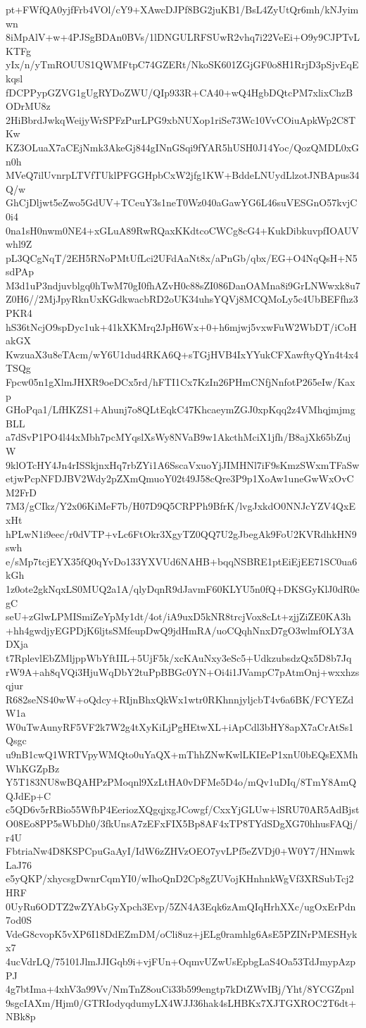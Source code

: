 pt+FWfQA0yjfFrb4VOl/cY9+XAwcDJPf8BG2juKB1/BsL4ZyUtQr6mh/kNJyimwn
8iMpAlV+w+4PJSgBDAn0BVs/1lDNGULRFSUwR2vhq7i22VeEi+O9y9CJPTvLKTFg
yIx/n/yTmROUUS1QWMFtpC74GZERt/NkoSK601ZGjGF0o8H1RrjD3pSjvEqEkqsl
fDCPPypGZVG1gUgRYDoZWU/QIp933R+CA40+wQ4HgbDQtcPM7xlixChzBODrMU8z
2HiBbrdJwkqWeijyWrSPFzPurLPG9xbNUXop1riSe73Wc10VvCOiuApkWp2C8TKw
KZ3OLuaX7aCEjNmk3AkeGj844gINnGSqi9fYAR5hUSH0J14Yoc/QozQMDL0xGn0h
MVeQ7ilUvnrpLTVfTUklPFGGHpbCxW2jfg1KW+BddeLNUydLlzotJNBApus34Q/w
GhCjDljwt5eZwo5GdUV+TCeuY3s1neT0Wz040aGawYG6L46suVESGnO57kvjC0i4
0na1sH0nwm0NE4+xGLuA89RwRQaxKKdtcoCWCg8cG4+KukDibkuvpfIOAUVwhl9Z
pL3QCgNqT/2EH5RNoPMtUfLci2UFdAaNt8x/aPnGb/qbx/EG+O4NqQsH+N5sdPAp
M3d1uP3ndjuvblgq0hTwM70gI0fhAZvH0c88sZI086DanOAMna8i9GrLNWwxk8u7
Z0H6//2MjJpyRknUxKGdkwacbRD2oUK34uhsYQVj8MCQMoLy5c4UbBEFfhz3PKR4
hS36tNcjO9spDyc1uk+41kXKMrq2JpH6Wx+0+h6mjwj5vxwFuW2WbDT/iCoHakGX
KwzuaX3u8eTAcm/wY6U1dud4RKA6Q+sTGjHVB4IxYYukCFXawftyQYn4t4x4TSQg
Fpcw05n1gXlmJHXR9oeDCx5rd/hFTI1Cx7KzIn26PHmCNfjNnfotP265eIw/Kaxp
GHoPqa1/LfHKZS1+Ahunj7o8QLtEqkC47KhcaeymZGJ0xpKqq2z4VMhqjmjmgBLL
a7dSvP1PO4l44xMbh7pcMYqslXsWy8NVaB9w1AkcthMciX1jfh/B8ajXk65bZujW
9klOTcHY4Jn4rISSkjnxHq7rbZYi1A6SscaVxuoYjJIMHNl7iF9sKmzSWxmTFaSw
etjwPcpNFDJBV2Wdy2pZXmQmuoY02t49J58cQre3P9p1XoAw1uneGwWxOvCM2FrD
7M3/gCIkz/Y2x06KiMeF7b/H07D9Q5CRPPh9BfrK/lvgJxkdO0NNJcYZV4QxExHt
hPLwN1i9eec/r0dVTP+vLc6FtOkr3XgyTZ0QQ7U2gJbegAk9FoU2KVRdhkHN9swh
e/sMp7tcjEYX35fQ0qYvDo133YXVUd6NAHB+bqqNSBRE1ptEiEjEE71SC0ua6kGh
1z0ote2gkNqxLS0MUQ2a1A/qlyDqnR9dJavmF60KLYU5n0fQ+DKSGyKlJ0dR0egC
seU+zGlwLPMISmiZeYpMy1dt/4ot/iA9uxD5kNR8trcjVox8cLt+zjjZiZE0KA3h
+hh4gwdjyEGPDjK6ljtsSMfeupDwQ9jdHmRA/uoCQqhNnxD7gO3wlmfOLY3ADXja
t7RplevlEbZMljppWbYftIIL+5UjF5k/xcKAuNxy3eSc5+UdkzubsdzQx5D8b7Jq
rW9A+ah8qVQi3HjuWqDbY2tuPpBBGc0YN+Oi4i1JVampC7pAtmOnj+wxxhzsqjur
R682seNS40wW+oQdcy+RIjnBhxQkWx1wtr0RKhnnjyljcbT4v6a6BK/FCYEZdW1a
W0uTwAunyRF5VF2k7W2g4tXyKiLjPgHEtwXL+iApCdl3bHY8apX7aCrAtSs1Qsgc
u9nB1cwQ1WRTVpyWMQto0uYaQX+mThhZNwKwlLKIEeP1xnU0bEQsEXMhWhKGZpBz
Y5T183NU8wBQAHPzPMoqnl9XzLtHA0vDFMe5D4o/mQv1uDIq/8TmY8AmQQJdEp+C
c5QD6v5rRBio55WfbP4EeriozXQgqjxgJCowgf/CxxYjGLUw+lSRU70AR5AdBjst
O08Eo8PP5sWbDh0/3fkUnsA7zEFxFIX5Bp8AF4xTP8TYdSDgXG70hhusFAQj/r4U
FbtriaNw4D8KSPCpuGaAyI/IdW6zZHVzOEO7yvLPf5eZVDj0+W0Y7/HNmwkLaJ76
e5yQKP/xhycsgDwnrCqmYI0/wIhoQnD2Cp8gZUVojKHnhnkWgVf3XRSubTcj2HRF
0UyRu6ODTZ2wZYAbGyXpch3Evp/5ZN4A3Eqk6zAmQIqHrhXXc/ugOxErPdn7od0S
VdeG8cvopK5vXP6I18DdEZmDM/oCli8uz+jELg0ramhlg6AsE5PZINrPMESHykx7
4ucVdrLQ/75101JlmJJIGqb9i+vjFUn+OqmvUZwUsEpbgLaS4Oa53TdJmypAzpPJ
4g7btIma+4xhV3a99Vv/NmTnZ8ouCi33b599engtp7kDtZWvIBj/Yht/8YCGZpnl
9sgcIAXm/Hjm0/GTRIodyqdumyLX4WJJ36hak4sLHBKx7XJTGXROC2T6dt+NBk8p
